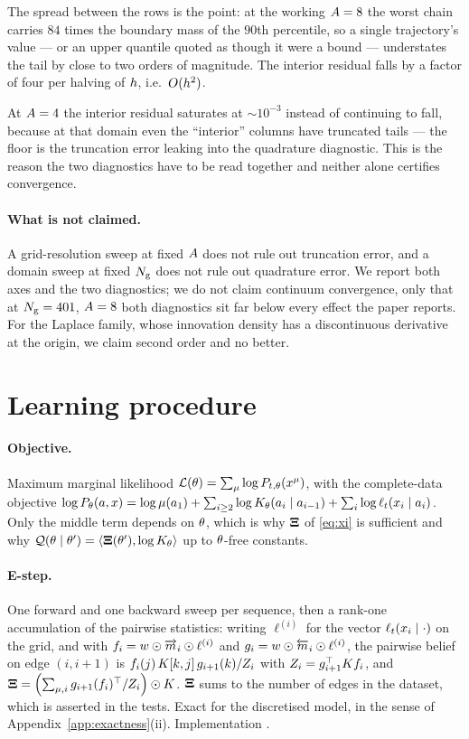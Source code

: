 \noindent
The spread between the rows is the point: at the working $A=8$ the worst chain carries
$84$ times the boundary mass of the $90$th percentile, so a single trajectory's value --- or an
upper quantile quoted as though it were a bound --- understates the tail by close to two orders of
magnitude. The interior residual falls by a factor of four per halving of $h$, i.e.\
$O(h^2)$.

At $A=4$ the interior residual saturates at $\sim10^{-3}$ instead of continuing to fall,
because at that domain even the ``interior'' columns have truncated tails --- the floor is the
truncation error leaking into the quadrature diagnostic. This is the reason the two diagnostics
have to be read together and neither alone certifies convergence.

\paragraph{What is not claimed.} A grid-resolution sweep at fixed $A$ does not rule out
truncation error, and a domain sweep at fixed $N_{\mathrm{g}}$ does not rule out quadrature error. We
report both axes and the two diagnostics; we do not claim continuum convergence, only that at
$N_{\mathrm{g}}=401$, $A=8$ both diagnostics sit far below every effect the paper reports.
For the Laplace family, whose innovation density has a discontinuous derivative at the origin, we
claim second order and no better.

\section{Learning procedure}
\label{app:learning}

\paragraph{Objective.} Maximum marginal likelihood
$\mathcal{L}(\theta) = \sum_\mu\log P_{t,\theta}(x^\mu)$, with the complete-data objective
$\log P_\theta(a,x) = \log\mu(a_1) + \sum_{i\ge2}\log K_{\theta}(a_i\mid a_{i-1}) +
\sum_i\log\ell_t(x_i\mid a_i)$. Only the middle term depends on $\theta$, which is why $\mathbf{\Xi}$ of
\eqref{eq:xi} is sufficient and why $\mathcal{Q}(\theta\mid\theta') = \langle\mathbf{\Xi}(\theta'),
\log K_{\theta}\rangle$ up to $\theta$-free constants.

\paragraph{E-step.} One forward and one backward sweep per sequence, then a rank-one accumulation
of the pairwise statistics: writing $\ell^{(i)}$ for the vector $\ell_t(x_i\mid \cdot)$ on the
grid, and with $f_i = w\odot\overrightarrow{m}_i\odot\ell^{(i)}$ and $g_i = w\odot\overleftarrow{m}_i\odot\ell^{(i)}$,
the pairwise belief on edge $(i,i+1)$ is
$f_i(j)\,K[k,j]\,g_{i+1}(k)/Z_i$ with $Z_i = g_{i+1}^\top K f_i$, and
$\mathbf{\Xi} = \left(\sum_{\mu,i} g_{i+1}(f_i)^\top/Z_i\right)\odot K$. $\mathbf{\Xi}$ sums to the number
of edges in the dataset, which is asserted in the tests. Exact for the discretised model, in the
sense of Appendix~\ref{app:exactness}(ii). Implementation \coderef{src/em.py}{e\_step}.

